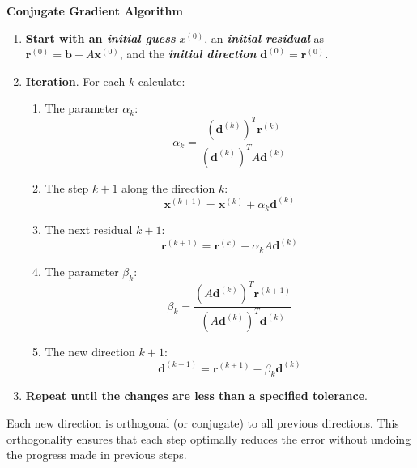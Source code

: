 \begin{flushleft}
    \textcolor{Green3}{ \textbf{Conjugate Gradient Algorithm}}
\end{flushleft}
\begin{enumerate}
    \item \textbf{Start with an \emph{initial guess}} $x^{\left(0\right)}$, an \textbf{\emph{initial residual}} as $\mathbf{r}^{\left(0\right)} = \mathbf{b} - A\mathbf{x}^{\left(0\right)}$, and the \textbf{\emph{initial direction}} $\mathbf{d}^{\left(0\right)} = \mathbf{r}^{\left(0\right)}$.
    \item \textbf{Iteration}. For each $k$ calculate:
    \begin{enumerate}
        \item The parameter $\alpha_{k}$:
        \begin{equation}
            \alpha_{k} = \dfrac{
                \left(\mathbf{d}^{\left(k\right)}\right)^{T}\mathbf{r}^{\left(k\right)}
            }{
                \left(\mathbf{d}^{\left(k\right)}\right)^{T}A\mathbf{d}^{\left(k\right)}
            }
        \end{equation}

        \item The step $k+1$ along the direction $k$:
        \begin{equation}
            \mathbf{x}^{\left(k+1\right)} = \mathbf{x}^{\left(k\right)} + \alpha_{k}\mathbf{d}^{\left(k\right)}
        \end{equation}

        \item The next residual $k+1$:
        \begin{equation}
            \mathbf{r}^{\left(k+1\right)} = \mathbf{r}^{\left(k\right)} - \alpha_{k}A\mathbf{d}^{\left(k\right)}
        \end{equation}

        \item The parameter $\beta_{k}$:
        \begin{equation}
            \beta_{k} = \dfrac{
                \left(A\mathbf{d}^{\left(k\right)}\right)^{T}\mathbf{r}^{\left(k+1\right)}
            }{
                \left(A\mathbf{d}^{\left(k\right)}\right)^{T}\mathbf{d}^{\left(k\right)}
            }
        \end{equation}

        \item The new direction $k+1$:
        \begin{equation}
            \mathbf{d}^{\left(k+1\right)} = \mathbf{r}^{\left(k+1\right)} - \beta_{k}\mathbf{d}^{\left(k\right)}
        \end{equation}
    \end{enumerate}
    \item \textbf{Repeat until the changes are less than a specified tolerance}.
\end{enumerate}
Each new direction is orthogonal (or conjugate) to all previous directions. This orthogonality ensures that each step optimally reduces the error without undoing the progress made in previous steps.

